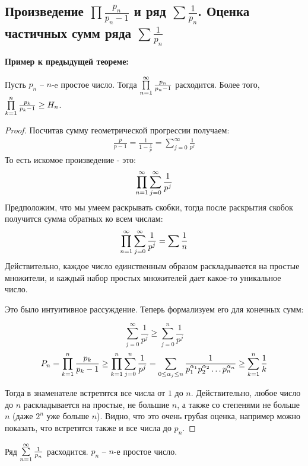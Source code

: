 \subsection{Произведение $\prod \frac{p_n}{p_n - 1}$ и ряд $\sum \frac{1}{p_n}$. Оценка частичных сумм ряда $\sum \frac{1}{p_n}$}
\textbf{Пример к предыдущей теореме:}

Пусть $p_n$ -- $n$-e простое число. Тогда $\prod \limits_{n=1}^\infty \frac{p_n}{p_n - 1}$ расходится.
Более того, $\prod \limits_{k=1}^n \frac{p_k}{p_k - 1} \geq H_n$.

\begin{proof}
    Посчитав сумму геометрической прогрессии получаем:
    \begin{gather*}
        \frac{p}{p-1} = \frac{1}{1-\frac{1}{p}} = \sum \limits_{j=0}^\infty \frac{1}{p^j}
    \end{gather*}
    То есть искомое произведение - это:
    \begin{gather*}
        \prod \limits_{n=1}^\infty \sum \limits_{j=0}^\infty \frac{1}{p^j}
    \end{gather*}
    Предположим, что мы умеем раскрывать скобки, тогда после раскрытия скобок получится сумма обратных ко всем числам:
    \begin{gather*}
        \prod \limits_{n=1}^\infty \sum \limits_{j=0}^\infty \frac{1}{p^j} = \sum \frac{1}{n}
    \end{gather*}
    Действительно, каждое число единственным образом раскладывается на простые множители, и каждый набор простых множителей дает какое-то уникальное число.

    Это было интуитивное рассуждение. Теперь формализуем его для конечных сумм:

    \[\sum \limits_{j=0}^\infty \frac{1}{p^j} \geq \sum \limits_{j=0}^n \frac{1}{p^j}\]
    \[P_n = \prod \limits_{k=1}^n \frac{p_k}{p_k - 1} \geq \prod \limits_{k=1}^n \sum \limits_{j=0}^n \frac{1}{p^j} = 
    \sum_{0 \leq \alpha_j \leq n} \frac{1}{p_1^{\alpha_1}p_2^{\alpha_2}\ldots p_n^{\alpha_n}} \geq \sum \limits_{k=1}^n \frac{1}{k} \]

    Тогда в знаменателе встретятся все числа от $1$ до $n$. Действительно, любое число до $n$ раскладывается на простые,
    не большие $n$, а также со степенями не больше $n$ (даже $2^n$ уже больше $n$). Видно, что это очень грубая оценка, например можно
    показать, что встретятся также и все числа до $p_n$.
\end{proof}

\begin{theorem}
    Ряд $\sum \limits_{n=1}^\infty \frac{1}{p_n}$ расходится. $p_n$ -- $n$-е простое число.
\end{theorem}

